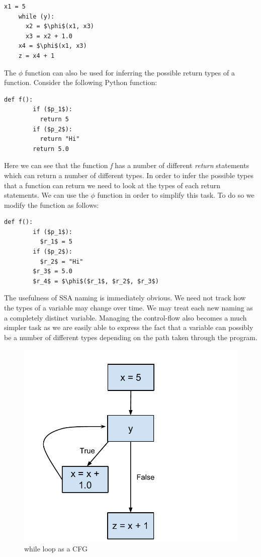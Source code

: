 \documentclass[12pt, titlepage]{article}
\begin{document}
\begin{lstlisting}[mathescape]
	x1 = 5
	while (y):
	  x2 = $\phi$(x1, x3)
	  x3 = x2 + 1.0
	x4 = $\phi$(x1, x3)
	z = x4 + 1
\end{lstlisting}
The $\phi$ function can also be used for inferring the possible return types of a function. Consider the following Python function:
\begin{lstlisting}[mathescape]
	def f():
		if ($p_1$):
		  return 5
		if ($p_2$):
		  return "Hi"
		return 5.0
\end{lstlisting}
Here we can see that the function \textit{f} has a number of different \textit{return} statements which can return a number of different types. In order to infer the possible types that a function can return we need to look at the types of each return statements. We can use the $\phi$ function in order to simplify this task. To do so we modify the function as follows:
\begin{lstlisting}[mathescape]
	def f():
		if ($p_1$):
		  $r_1$ = 5
		if ($p_2$):
		  $r_2$ = "Hi"
		$r_3$ = 5.0
		$r_4$ = $\phi$($r_1$, $r_2$, $r_3$)
\end{lstlisting}

The usefulness of SSA naming is immediately obvious. We need not track how the types of a variable may change over time. We may treat each new naming as a completely distinct variable. Managing the control-flow also becomes a much simpler task as we are easily able to express the fact that a variable can possibly be a number of different types depending on the path taken through the program.

\begin{figure}[h]
\centering
\includegraphics[scale=0.5]{images/ssaPhiNode.pdf}
\caption{while loop as a CFG}
\label{phiCFG}
\end{figure}
\end{document}
